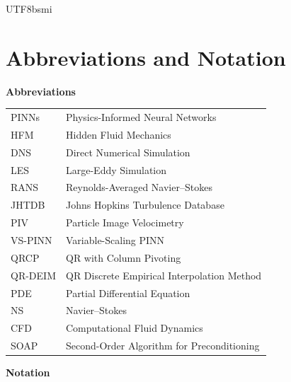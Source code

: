 \documentclass[master]{NTHUthesis}
\begin{document}
\begin{CJK*}{UTF8}{bsmi}
\chapter*{Abbreviations and Notation}

\noindent\textbf{Abbreviations}

\begin{tabular}{ll}
PINNs & Physics-Informed Neural Networks \\
HFM   & Hidden Fluid Mechanics \\
DNS   & Direct Numerical Simulation \\
LES   & Large-Eddy Simulation \\
RANS  & Reynolds-Averaged Navier--Stokes \\
JHTDB & Johns Hopkins Turbulence Database \\
PIV   & Particle Image Velocimetry \\
VS-PINN & Variable-Scaling PINN \\
QRCP  & QR with Column Pivoting \\
QR-DEIM & QR Discrete Empirical Interpolation Method \\
PDE   & Partial Differential Equation \\
NS    & Navier--Stokes \\
CFD   & Computational Fluid Dynamics \\
SOAP  & Second-Order Algorithm for Preconditioning \\
\end{tabular}

\vspace{1em}
\noindent\textbf{Notation}


\end{CJK*}
\end{document}
